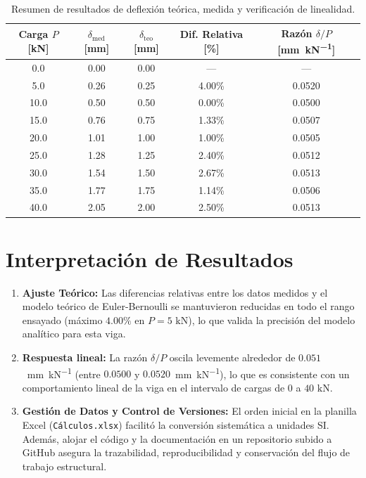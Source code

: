 \documentclass[10pt,letterpaper]{article}
\begin{document}
\begin{table}[h!]
\centering
\caption{Resumen de resultados de deflexión teórica, medida y verificación de linealidad.}
\label{tab:resultados}
\begin{tabular}{ccccc}
\toprule
\textbf{Carga $P$ [\si{\kilo\newton}]} & \textbf{$\delta_{\text{med}}$ [\si{\milli\meter}]} & \textbf{$\delta_{\text{teo}}$ [\si{\milli\meter}]} & \textbf{Dif. Relativa [\%]} & \textbf{Razón $\delta/P$ [\si{\milli\meter\per\kilo\newton}]} \\
\midrule
0.0  & 0.00 & 0.00 & — & — \\
5.0  & 0.26 & 0.25 & 4.00\% & 0.0520 \\
10.0 & 0.50 & 0.50 & 0.00\% & 0.0500 \\
15.0 & 0.76 & 0.75 & 1.33\% & 0.0507 \\
20.0 & 1.01 & 1.00 & 1.00\% & 0.0505 \\
25.0 & 1.28 & 1.25 & 2.40\% & 0.0512 \\
30.0 & 1.54 & 1.50 & 2.67\% & 0.0513 \\
35.0 & 1.77 & 1.75 & 1.14\% & 0.0506 \\
40.0 & 2.05 & 2.00 & 2.50\% & 0.0513 \\
\bottomrule
\end{tabular}
\end{table}

\section{Interpretación de Resultados}

\begin{enumerate}
    \item \textbf{Ajuste Teórico:} Las diferencias relativas entre los datos medidos y el modelo teórico de Euler-Bernoulli se mantuvieron reducidas en todo el rango ensayado (máximo $4.00\%$ en $P = 5\text{ kN}$), lo que valida la precisión del modelo analítico para esta viga.
    \item \textbf{Respuesta lineal:} La razón $\delta/P$ oscila levemente alrededor de $0.051$~\si{\milli\meter\per\kilo\newton} (entre $0.0500$ y $0.0520$~\si{\milli\meter\per\kilo\newton}), lo que es consistente con un comportamiento lineal de la viga en el intervalo de cargas de $0$ a $40\text{ kN}$.
    \item \textbf{Gestión de Datos y Control de Versiones:} El orden inicial en la planilla Excel (\texttt{Cálculos.xlsx}) facilitó la conversión sistemática a unidades SI. Además, alojar el código y la documentación en un repositorio subido a GitHub asegura la trazabilidad, reproducibilidad y conservación del flujo de trabajo estructural.
\end{enumerate}
\end{document}
